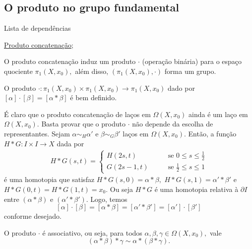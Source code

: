 \subsection{O produto no grupo fundamental} %
\label{produto-bem-definido-prop}
\begin{titlemize}{Lista de dependências}
	\item \hyperref[Produto-grupo-fundamental-def]{Produto concatenação};\\ %
\end{titlemize}
O produto concatenação induz um produto $\cdot$ (operação binária) para o espaço quociente $\pi_1(X,x_0),$ além disso, $(\pi_1(X,x_0),\cdot)$ forma um grupo.

\begin{lemma}%
    O produto $\cdot:\pi_1(X,x_0)\times\pi_1(X,x_0)\rightarrow \pi_1(X,x_0)$ dado por $[\alpha]\cdot[\beta]=[\alpha*\beta]$ é bem definido.
\end{lemma}

\begin{dem}
    É claro que o produto concatenação de laços em $\Omega(X,x_0)$ ainda é um laço em $\Omega(X,x_0).$ Basta provar que o produto $\cdot$ não depende da escolha de representantes. Sejam $\alpha\sim_H \alpha'$ e $\beta\sim_G\beta'$ laços em $\Omega(X,x_0)$. Então, a função $H*G:I\times I\rightarrow X$ dada por 
    \begin{align*}
        H*G(s,t)=\begin{cases}
            H(2s,t)\;\;\;&\;\;\;\mbox{ se }0\le s\le \frac{1}{2}\\
            G(2s-1,t)\;\;\;&\;\;\;\mbox{ se }\frac{1}{2}\le s\le1
        \end{cases}
    \end{align*}
    é uma homotopia que satisfaz $H*G(s,0)=\alpha*\beta,$ $H*G(s,1)=\alpha'*\beta'$ e $H*G(0,t)=H*G(1,t)=x_0.$ Ou seja $H*G$ é uma homotopia relativa à $\partial I$ entre $(\alpha*\beta)$ e $(\alpha'*\beta').$ Logo, temos  
    $$[\alpha]\cdot[\beta]=[\alpha*\beta]=[\alpha'*\beta']=[\alpha']\cdot [\beta']$$
    conforme desejado.
\end{dem}

\begin{lemma}
    O produto $\cdot$ é associativo, ou seja, para todos $\alpha,\beta,\gamma\in\Omega(X,x_0),$ vale
    \[(\alpha*\beta)*\gamma\sim \alpha*(\beta*\gamma).\]
\end{lemma}

